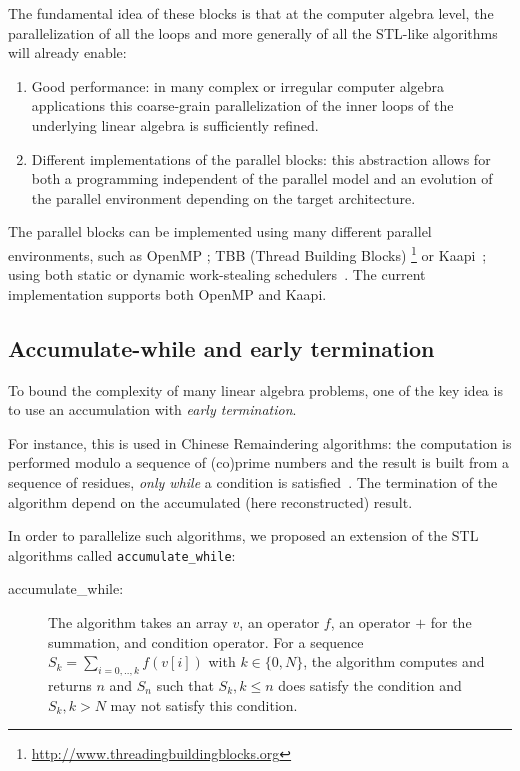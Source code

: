 \documentclass[runningheads,a4paper]{llncs}
\begin{document}
  The fundamental idea of these blocks is that at the computer algebra
  level, the parallelization of all the loops and more generally of all
  the STL-like algorithms will already enable:
\begin{enumerate}
\item Good performance: in many complex or irregular computer algebra
  applications this coarse-grain parallelization of the inner loops of
  the underlying linear algebra is sufficiently refined.
\item Different implementations of the parallel blocks: this
  abstraction allows for both a programming independent of the
  parallel model and an evolution of the parallel environment
  depending on the target architecture.
\end{enumerate}

The parallel blocks can be implemented using many different parallel
environments, such as OpenMP
\cite{Chapman:2007:openmp}; TBB (Thread Building Blocks)
  \footnote{\url{http://www.threadingbuildingblocks.org}} or
  Kaapi~\cite{inproceedingsgautier.gbp_ktsrsf_07}; using
  both static or dynamic work-stealing
  schedulers~\cite{con-traore.trmgb_08}.
The current implementation supports both OpenMP and Kaapi.

\subsection{Accumulate-while and early termination}
To bound the complexity of many linear algebra problems, one of the
key idea is to use an accumulation with {\em early termination}.

For instance, this is used in Chinese Remaindering algorithms: the
computation is performed modulo a sequence of (co)prime numbers and
the result is built from a sequence of residues, {\em only while} a
condition is satisfied~\cite{jgd:2010:crt}. 
The termination of the algorithm depend on the accumulated (here
reconstructed) result.
  
In order to parallelize such algorithms, we proposed an extension of
the STL algorithms called \verb+accumulate_while+:
\begin{description} 
\item [accumulate\_while:] The algorithm takes an array $v$, an
  operator $f$, an operator $+$ for the summation, and condition
  operator.
  For a sequence $S_k = \sum_{i=0,..,k} f( v[i])$ with 
  $k \in \{0,N\}$, the algorithm computes and returns $n$ and $S_n$ such that 
  $S_k, k \leq n$ does satisfy the condition and $S_k, k > N$
  may not satisfy this condition.
\end{description} 
\end{document}
